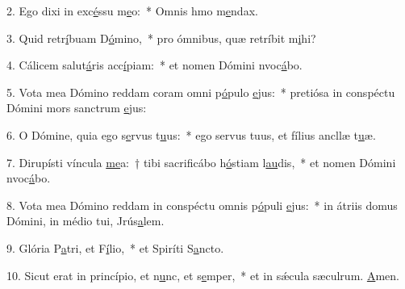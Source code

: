 2. Ego dixi in exc\uline{é}ssu m\uline{e}o:~* Omnis hmo m\uline{e}ndax.\par 
3. Quid retr\uline{í}buam D\uline{ó}mino,~* pro ómnibus, quæ retríbit m\uline{i}hi?\par 
4. Cálicem salut\uline{á}ris acc\uline{í}piam:~* et nomen Dómini nvoc\uline{á}bo.\par 
5. Vota mea Dómino reddam coram omni p\uline{ó}pulo \uline{e}jus:~* pretiósa in conspéctu Dómini mors sanctrum \uline{e}jus:\par 
6. O Dómine, quia ego s\uline{e}rvus t\uline{u}us:~* ego servus tuus, et fílius ancllæ t\uline{u}æ.\par 
7. Dirupísti víncula \uline{me}a:~† tibi sacrificábo h\uline{ó}stiam l\uline{au}dis,~* et nomen Dómini nvoc\uline{á}bo.\par 
8. Vota mea Dómino reddam in conspéctu omnis p\uline{ó}puli \uline{e}jus:~* in átriis domus Dómini, in médio tui, Jrús\uline{a}lem.\par 
9. Glória P\uline{a}tri, et F\uline{í}lio,~* et Spiríti S\uline{a}ncto.\par 
10. Sicut erat in princípio, et n\uline{u}nc, et s\uline{e}mper,~* et in sǽcula sæculrum. \uline{A}men.\par 
